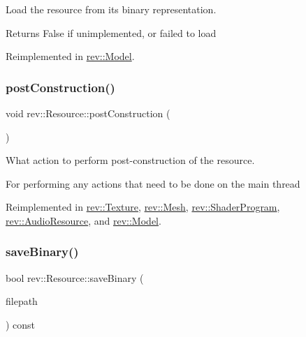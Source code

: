 Load the resource from its binary representation. 

\begin{DoxyReturn}{Returns}
False if unimplemented, or failed to load 
\end{DoxyReturn}


Reimplemented in \mbox{\hyperlink{classrev_1_1_model_aa61390d068bc81cd1d28c8bf44c88008}{rev\+::\+Model}}.

\mbox{\label{classrev_1_1_resource_a8a6daa71820d88c86bc6c0aa474d1af7}} 
\subsubsection{\texorpdfstring{postConstruction()}{postConstruction()}}
{\footnotesize\ttfamily void rev\+::\+Resource\+::post\+Construction (\begin{DoxyParamCaption}{ }\end{DoxyParamCaption})\hspace{0.3cm}{\ttfamily [virtual]}}



What action to perform post-\/construction of the resource. 

For performing any actions that need to be done on the main thread 

Reimplemented in \mbox{\hyperlink{classrev_1_1_texture_aaa505679ad69f466e6aa9027e0419684}{rev\+::\+Texture}}, \mbox{\hyperlink{classrev_1_1_mesh_a66d46be8133030a0a02911d9def03f47}{rev\+::\+Mesh}}, \mbox{\hyperlink{classrev_1_1_shader_program_a1b08ee659241ede0227457821a4971a2}{rev\+::\+Shader\+Program}}, \mbox{\hyperlink{classrev_1_1_audio_resource_a485cda6016a1dc52310239fb6c58e8cd}{rev\+::\+Audio\+Resource}}, and \mbox{\hyperlink{classrev_1_1_model_a30a84dac2ff91c87bf920dd3a68411e5}{rev\+::\+Model}}.

\mbox{\label{classrev_1_1_resource_afbd64f3d18060ce32a995dbfb5472f91}} 
\subsubsection{\texorpdfstring{saveBinary()}{saveBinary()}}
{\footnotesize\ttfamily bool rev\+::\+Resource\+::save\+Binary (\begin{DoxyParamCaption}\item[{const \mbox{\hyperlink{classrev_1_1_g_string}{G\+String}} \&}]{filepath }\end{DoxyParamCaption}) const\hspace{0.3cm}{\ttfamily [virtual]}}



